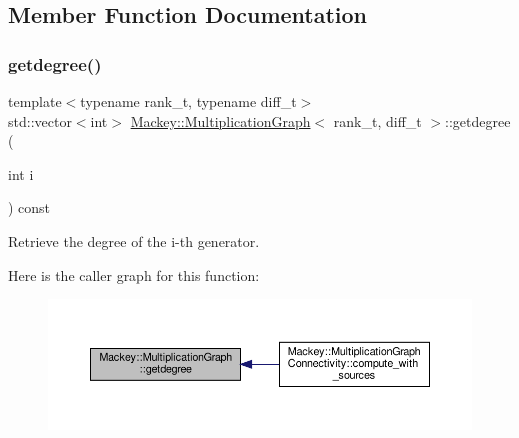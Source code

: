 \subsection{Member Function Documentation}
\mbox{\label{classMackey_1_1MultiplicationGraph_a1616acd79b92c94994648835a7941753}} 
\subsubsection{\texorpdfstring{getdegree()}{getdegree()}}
{\footnotesize\ttfamily template$<$typename rank\+\_\+t, typename diff\+\_\+t$>$ \\
std\+::vector$<$int$>$ \hyperlink{classMackey_1_1MultiplicationGraph}{Mackey\+::\+Multiplication\+Graph}$<$ rank\+\_\+t, diff\+\_\+t $>$\+::getdegree (\begin{DoxyParamCaption}\item[{int}]{i }\end{DoxyParamCaption}) const\hspace{0.3cm}{\ttfamily [inline]}}



Retrieve the degree of the i-\/th generator. 

Here is the caller graph for this function\+:\nopagebreak
\begin{figure}[H]
\begin{center}
\leavevmode
\includegraphics[width=350pt]{classMackey_1_1MultiplicationGraph_a1616acd79b92c94994648835a7941753_icgraph}
\end{center}
\end{figure}
\mbox{\label{classMackey_1_1MultiplicationGraph_acb5d06dd354041e4726a5aea5e11e847}} 

